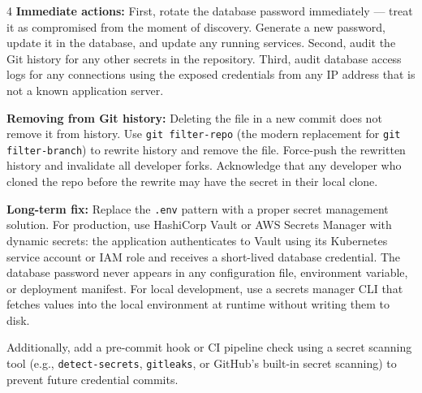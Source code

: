 \documentclass[11pt,a4paper]{article}
\begin{document}
\begin{answerbox}{4}
\textbf{Immediate actions:} First, rotate the database password immediately --- treat it as compromised from the moment of discovery. Generate a new password, update it in the database, and update any running services. Second, audit the Git history for any other secrets in the repository. Third, audit database access logs for any connections using the exposed credentials from any IP address that is not a known application server.

\textbf{Removing from Git history:} Deleting the file in a new commit does not remove it from history. Use \texttt{git filter-repo} (the modern replacement for \texttt{git filter-branch}) to rewrite history and remove the file. Force-push the rewritten history and invalidate all developer forks. Acknowledge that any developer who cloned the repo before the rewrite may have the secret in their local clone.

\textbf{Long-term fix:} Replace the \texttt{.env} pattern with a proper secret management solution. For production, use HashiCorp Vault or AWS Secrets Manager with dynamic secrets: the application authenticates to Vault using its Kubernetes service account or IAM role and receives a short-lived database credential. The database password never appears in any configuration file, environment variable, or deployment manifest. For local development, use a secrets manager CLI that fetches values into the local environment at runtime without writing them to disk.

Additionally, add a pre-commit hook or CI pipeline check using a secret scanning tool (e.g., \texttt{detect-secrets}, \texttt{gitleaks}, or GitHub's built-in secret scanning) to prevent future credential commits.
\end{answerbox}

\vspace{0.4cm}
\end{document}
